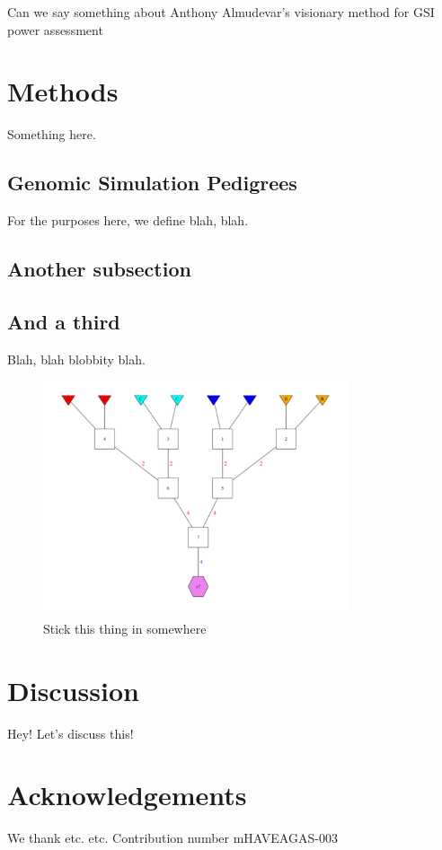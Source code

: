 Can we say something about Anthony Almudevar's visionary method for GSI power assessment \citep{almudevar2000exact}


\section*{Methods}

Something here.

\subsection*{Genomic Simulation Pedigrees}

For the purposes here, we define blah, blah.

\subsection*{Another subsection}



\subsection*{And a third}

Blah, blah blobbity blah.


\begin{figure}
\begin{center}
\includegraphics[width=0.8\textwidth]{images/gsp4-700.pdf}
\end{center}
\caption[]{Stick this thing in somewhere}
\end{figure}




\section*{Discussion}
Hey! Let's discuss this!



\section*{Acknowledgements}
We thank etc. etc.   Contribution number  mHAVEAGAS-003